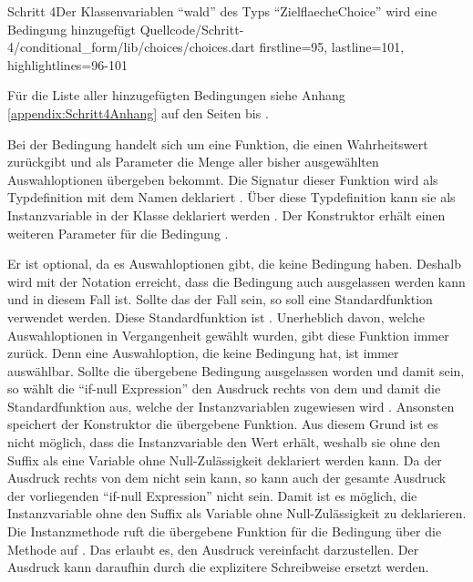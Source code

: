 \begin{alexlisting}{Schritt 4}{Der Klassenvariablen \enquote{wald} des Typs \enquote{ZielflaecheChoice} wird eine Bedingung hinzugefügt}
  {Quellcode/Schritt-4/conditional_form/lib/choices/choices.dart}
  {firstline=95, lastline=101, highlightlines={96-101}}
  \label{lst:Schritt4wald}
\end{alexlisting}

Für die Liste aller hinzugefügten Bedingungen siehe Anhang \ref{appendix:Schritt4Anhang} auf den Seiten \pageref{lst:Schritt4KategorieChoice} bis  \pageref{lst:Schritt4ZieleinheitChoice}.

Bei der Bedingung handelt sich um eine Funktion,
die einen Wahrheitswert  zurückgibt und als Parameter die Menge aller bisher ausgewählten Auswahloptionen  übergeben bekommt.
Die Signatur dieser Funktion wird als Typdefinition mit dem Namen  deklariert .
Über diese Typdefinition kann sie als Instanzvariable in der Klasse  deklariert werden .
Der Konstruktor erhält einen weiteren Parameter für die Bedingung .

Er ist optional,
da es Auswahloptionen gibt,
die keine Bedingung haben.
Deshalb wird mit der Notation  erreicht,
dass die Bedingung auch ausgelassen werden kann und in diesem Fall  ist.
Sollte das der Fall sein,
so soll eine Standardfunktion verwendet werden.
Diese Standardfunktion ist  .
Unerheblich davon,
 welche Auswahloptionen in Vergangenheit gewählt wurden,
gibt diese Funktion immer  zurück.
Denn eine Auswahloption,
die keine Bedingung hat,
ist immer auswählbar.
Sollte die übergebene Bedingung ausgelassen worden und damit  sein,
so wählt die \enquote{if-null Expression} den Ausdruck rechts von dem  und damit die Standardfunktion  aus,
welche der Instanzvariablen  zugewiesen wird .
Ansonsten speichert der Konstruktor die übergebene Funktion.
Aus diesem Grund ist es nicht möglich,
dass die Instanzvariable  den Wert  erhält,
weshalb sie ohne den Suffix  als eine Variable ohne Null-Zulässigkeit deklariert werden kann.
Da der Ausdruck rechts von dem  nicht  sein kann,
so kann auch der gesamte Ausdruck der vorliegenden \enquote{if-null Expression} nicht  sein.
Damit ist es möglich,
die Instanzvariable  ohne den Suffix  als Variable ohne Null-Zulässigkeit zu deklarieren.
Die Instanzmethode  ruft die übergebene Funktion für die Bedingung über die Methode  auf .
Das erlaubt es, den Ausdruck vereinfacht darzustellen.
Der Ausdruck  kann daraufhin durch die explizitere Schreibweise  ersetzt werden.

